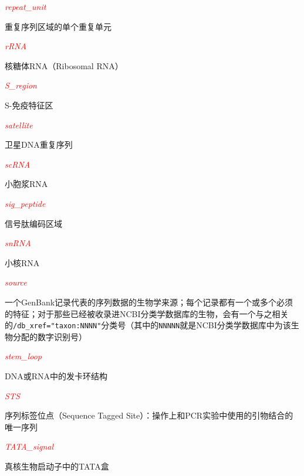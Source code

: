 \textcolor{red}{\textit{repeat\_unit}}
\begin{adjustwidth}{4em}{}
重复序列区域的单个重复单元
\end{adjustwidth}

\textcolor{red}{\textit{rRNA}}
\begin{adjustwidth}{4em}{}
核糖体RNA（Ribosomal RNA）
\end{adjustwidth}

\textcolor{red}{\textit{S\_region}}
\begin{adjustwidth}{4em}{}
S-免疫特征区
\end{adjustwidth}

\textcolor{red}{\textit{satellite}}
\begin{adjustwidth}{4em}{}
卫星DNA重复序列
\end{adjustwidth}

\textcolor{red}{\textit{scRNA}}
\begin{adjustwidth}{4em}{}
小胞浆RNA
\end{adjustwidth}

\textcolor{red}{\textit{sig\_peptide}}
\begin{adjustwidth}{4em}{}
信号肽编码区域
\end{adjustwidth}

\textcolor{red}{\textit{snRNA}}
\begin{adjustwidth}{4em}{}
小核RNA
\end{adjustwidth}

\textcolor{red}{\textit{source}}
\begin{adjustwidth}{4em}{}
一个GenBank记录代表的序列数据的生物学来源；每个记录都有一个或多个必须的特征；对于那些已经被收录进NCBI分类学数据库的生物，会有一个与之相关的\verb|/db_xref="taxon:NNNN"|分类号（其中的\verb|NNNNN|就是NCBI分类学数据库中为该生物分配的数字识别号）
\end{adjustwidth}

\textcolor{red}{\textit{stem\_loop}}
\begin{adjustwidth}{4em}{}
DNA或RNA中的发卡环结构
\end{adjustwidth}

\textcolor{red}{\textit{STS}}
\begin{adjustwidth}{4em}{}
序列标签位点（Sequence Tagged Site）：操作上和PCR实验中使用的引物结合的唯一序列
\end{adjustwidth}

\textcolor{red}{\textit{TATA\_signal}}
\begin{adjustwidth}{4em}{}
真核生物启动子中的TATA盒
\end{adjustwidth}

